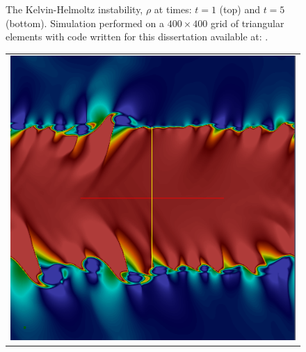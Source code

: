 \begin{figure}[htbp]
\begin{center}
\begin{tabular}{c}
\end{tabular}
\caption{The Kelvin-Helmoltz instability, $\rho$ at times: $t=1$ (top) and $t=5$ (bottom).  Simulation performed on a $400 \times 400$ grid of triangular elements with code written for this dissertation available at: \protect\gitrepo.}
\end{center} 
\label{fig:kh_instability}
\figSpace
\end{figure}

\begin{figure}[htbp]\figSpace
\begin{center} 
\begin{tabular}{c}
\includegraphics[width=0.4\textheight]{fig/kh_mhd_d_0100.png} \\ 

\end{tabular}
\end{center}
\end{figure}
